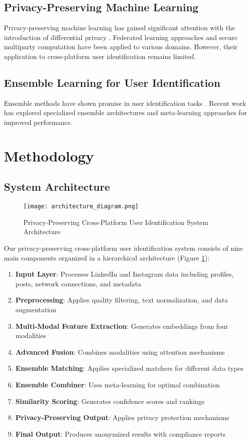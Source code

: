 \documentclass[conference]{IEEEtran}
\begin{document}
\subsection{Privacy-Preserving Machine Learning}
Privacy-preserving machine learning has gained significant attention with the introduction of differential privacy \cite{ref6}. Federated learning approaches \cite{ref7} and secure multiparty computation \cite{ref8} have been applied to various domains. However, their application to cross-platform user identification remains limited.

\subsection{Ensemble Learning for User Identification}
Ensemble methods have shown promise in user identification tasks \cite{ref9}. Recent work has explored specialized ensemble architectures \cite{ref10} and meta-learning approaches \cite{ref11} for improved performance.

\section{Methodology}

\subsection{System Architecture}

\begin{figure}[htbp]
\centering
\texttt{[image: architecture\_diagram.png]}
\caption{Privacy-Preserving Cross-Platform User Identification System Architecture}
\label{fig:architecture}
\end{figure}

Our privacy-preserving cross-platform user identification system consists of nine main components organized in a hierarchical architecture (Figure \ref{fig:architecture}):

\begin{enumerate}
\item \textbf{Input Layer}: Processes LinkedIn and Instagram data including profiles, posts, network connections, and metadata
\item \textbf{Preprocessing}: Applies quality filtering, text normalization, and data augmentation
\item \textbf{Multi-Modal Feature Extraction}: Generates embeddings from four modalities
\item \textbf{Advanced Fusion}: Combines modalities using attention mechanisms
\item \textbf{Ensemble Matching}: Applies specialized matchers for different data types
\item \textbf{Ensemble Combiner}: Uses meta-learning for optimal combination
\item \textbf{Similarity Scoring}: Generates confidence scores and rankings
\item \textbf{Privacy-Preserving Output}: Applies privacy protection mechanisms
\item \textbf{Final Output}: Produces anonymized results with compliance reports
\end{enumerate}
\end{document}
